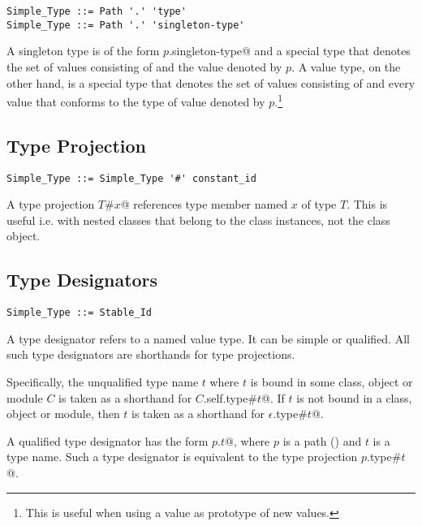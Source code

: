 \syntax\begin{lstlisting}
Simple_Type ::= Path '.' 'type'
Simple_Type ::= Path '.' 'singleton-type'
\end{lstlisting}

A singleton type is of the form \lstinline@$p$.singleton-type@ and a special type that denotes the set of values consisting of  and the value denoted by $p$. A value type, on the other hand, is a special type that denotes the set of values consisting of  and every value that conforms to the type of value denoted by $p$.\footnote{This is useful when using a value as prototype of new values.}






\subsection{Type Projection}
\label{sec:type-projection}

\syntax\begin{lstlisting}
Simple_Type ::= Simple_Type '#' constant_id
\end{lstlisting}

A type projection \lstinline@$T$#$x$@ references type member named $x$ of type $T$. This is useful i.e. with nested classes that belong to the class instances, not the class object. 






\subsection{Type Designators}

\syntax\begin{lstlisting}
Simple_Type ::= Stable_Id
\end{lstlisting}

A type designator refers to a named value type. It can be simple or qualified. All such type designators are shorthands for type projections. 

Specifically, the unqualified type name $t$ where $t$ is bound in some class, object or module $C$ is taken as a shorthand for \lstinline@$C$.self.type#$t$@. If $t$ is not bound in a class, object or module, then $t$ is taken as a shorthand for \lstinline@$\epsilon$.type#$t$@. 

A qualified type designator has the form \lstinline@$p$.$t$@, where $p$ is a path () and $t$ is a type name. Such a type designator is equivalent to the type projection \lstinline@$p$.type#$t$@. 






